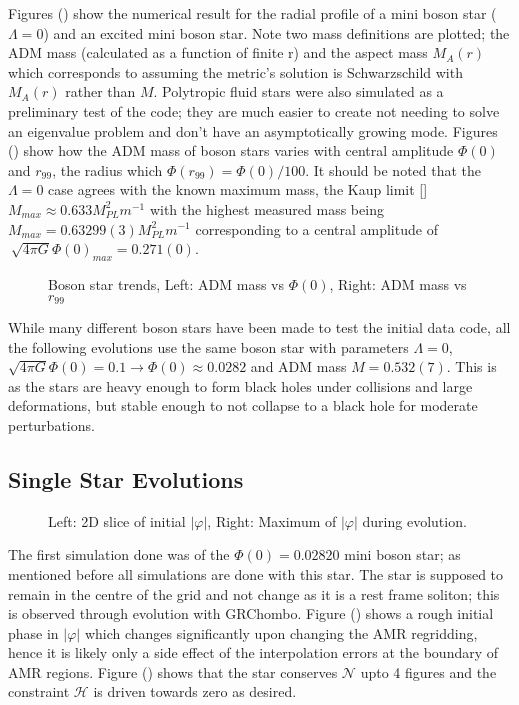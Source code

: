 \documentclass[11pt, oneside]{report}  %
\newcommand{\vp}{\varphi}
\numberwithin{equation}{section}
\begin{document}
Figures () show the numerical result for the radial profile of a mini boson star ($\Lambda=0$) and an excited mini boson star. Note two mass definitions are plotted; the ADM mass (calculated as a function of finite r) and the aspect mass $M_A(r)$ which corresponds to assuming the metric's solution is Schwarzschild with $M_A(r)$ rather than $M$. Polytropic fluid stars were also simulated as a preliminary test of the code; they are much easier to create not needing to solve an eigenvalue problem and don't have an asymptotically growing mode. Figures () show how the ADM mass of boson stars varies with central amplitude $\Phi(0)$ and $r_{99}$, the radius which $\Phi(r_{99}) = \Phi(0)/100$. It should be noted that the $\Lambda =0$ case agrees with the known maximum mass, the Kaup limit [] $M_{max} \approx 0.633 {M_{PL}^2}{m^{-1}}$ with the highest measured mass being $ M_{max} = 0.63299(3) {M_{PL}^2}{m^{-1}} $ corresponding to a central amplitude of $\ \sqrt{4\pi G}\Phi(0)_{max} = 0.271(0)$. 

  \begin{figure}[H]
  \caption{Boson star trends, Left: ADM mass vs $\Phi(0)$, Right: ADM mass vs $r_{99}$}
  \centering
  \hfill
\end{figure}

While many different boson stars have been made to test the initial data code, all the following evolutions use the same boson star with parameters $\Lambda=0$, $\sqrt{4\pi G}\Phi(0)=0.1 \rightarrow \Phi(0) \approx 0.0282$ and ADM mass $M=0.532(7)$. This is as the stars are heavy enough to form black holes under collisions and large deformations, but stable enough to not collapse to a black hole for moderate perturbations.


\subsection{Single Star Evolutions}
  \begin{figure}[H]
  \caption{Left: 2D slice of initial $|\vp|$, Right: Maximum of $|\vp|$ during evolution.}
  \centering
  \hfill
\end{figure}
The first simulation done was of the $\Phi(0)=0.02820$ mini boson star; as mentioned before all simulations are done with this star. The star is supposed to remain in the centre of the grid and not change as it is a rest frame soliton; this is observed through evolution with GRChombo. Figure () shows a rough initial phase in $|\vp|$ which changes significantly upon changing the AMR regridding, hence it is likely only a side effect of the interpolation errors at the boundary of AMR regions. Figure () shows that the star conserves $\mathcal{N}$ upto 4 figures and the constraint $\mathcal{H}$ is driven towards zero as desired.
\end{document}
